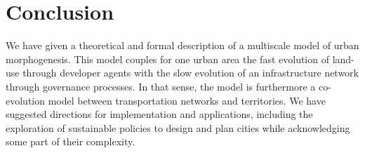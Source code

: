 \documentclass[letterpaper]{article}
\begin{document}
\section{Conclusion}

We have given a theoretical and formal description of a multiscale model of urban morphogenesis. This model couples for one urban area the fast evolution of land-use through developer agents with the slow evolution of an infrastructure network through governance processes. In that sense, the model is furthermore a co-evolution model between transportation networks and territories. We have suggested directions for implementation and applications, including the exploration of sustainable policies to design and plan cities while acknowledging some part of their complexity.





%


\footnotesize

\end{document}
